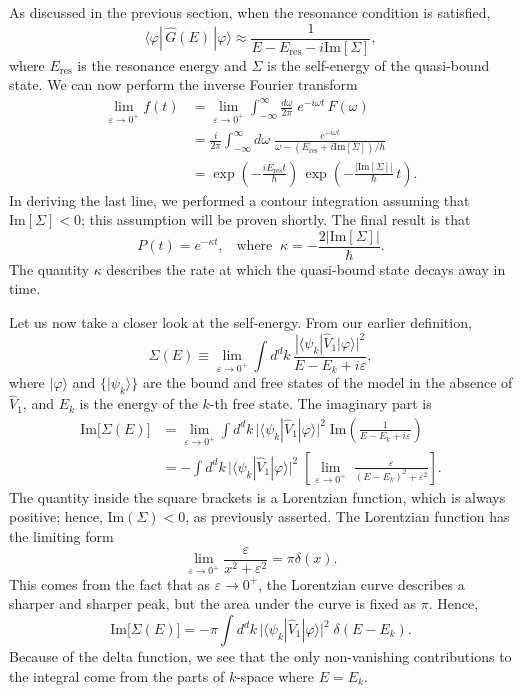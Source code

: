 \documentclass[pra,12pt]{revtex4}
\begin{document}
As discussed in the previous section, when the resonance condition is
satisfied,
$$ \langle\varphi|\,\hat{G}(E)\,|\varphi\rangle \approx \frac{1}{\displaystyle E - E_{\mathrm{res}} - i \mathrm{Im}[\Sigma]},$$
where $E_{\mathrm{res}}$ is the resonance energy and $\Sigma$ is the
self-energy of the quasi-bound state.  We can now perform the
inverse Fourier transform
$$\begin{aligned} \lim_{\varepsilon\rightarrow 0^+} f(t) &= \lim_{\varepsilon\rightarrow 0^+} \int_{-\infty}^{\infty} \frac{d\omega}{2\pi} \; e^{-i\omega t} \, F(\omega) \\ &= \frac{i}{2\pi} \int_{-\infty}^{\infty} d\omega\; \frac{e^{-i\omega t}}{\omega - (E_{\mathrm{res}}+i \mathrm{Im}[\Sigma])/\hbar}\\ &= \exp\left(-\frac{iE_{\mathrm{res}}t}{\hbar}\right)\, \exp\left(-\frac{|\mathrm{Im}[\Sigma]|}{\hbar}\,t\right). \end{aligned}$$
In deriving the last line, we performed a contour integration assuming
that $\mathrm{Im}[\Sigma] < 0$; this assumption will be proven
shortly.  The final result is that
$$P(t) = e^{-\kappa t}, \;\;\;\mathrm{where}\;\;\kappa = -\frac{2|\mathrm{Im}[\Sigma]|}{\hbar}.$$
The quantity $\kappa$ describes the rate at which the quasi-bound
state decays away in time.

Let us now take a closer look at the self-energy.  From our earlier
definition,
$$\Sigma(E) \equiv \lim_{\varepsilon\rightarrow0^+} \int d^dk\, \frac{\displaystyle| \langle\psi_k| \hat{V}_1|\varphi\rangle|^2}{\displaystyle E-E_k+i\varepsilon},$$
where $|\varphi\rangle$ and $\{|\psi_k\rangle\}$ are the bound and
free states of the model in the absence of $\hat{V}_1$, and $E_k$ is
the energy of the $k$-th free state.  The imaginary part is
$$\begin{aligned}\mathrm{Im}\big[\Sigma(E)\big] &= \lim_{\varepsilon\rightarrow0^+} \int d^dk\, \Big| \langle\psi_k| \hat{V}_1|\varphi\rangle\Big|^2 \; \mathrm{Im}\left( \frac{1}{\displaystyle E-E_k+i\varepsilon}\right) \\ &= - \int d^dk\, \Big| \langle\psi_k| \hat{V}_1|\varphi\rangle\Big|^2 \; \left[ \lim_{\varepsilon\rightarrow0^+} \; \frac{\varepsilon}{\displaystyle (E-E_k)^2 + \varepsilon^2}\right].\end{aligned}$$
The quantity inside the square brackets is a Lorentzian function,
which is always positive; hence, $\mathrm{Im}(\Sigma) < 0$, as
previously asserted.  The Lorentzian function has the limiting form
$$\lim_{\varepsilon\rightarrow 0^+} \frac{\varepsilon}{x^2+\varepsilon^2} = \pi\delta(x).$$
This comes from the fact that as $\varepsilon\rightarrow0^+$, the
Lorentzian curve describes a sharper and sharper peak, but the area
under the curve is fixed as $\pi$.  Hence,
$$\mathrm{Im}\big[\Sigma(E)\big] = - \pi \int d^dk\, \Big| \langle\psi_k| \hat{V}_1|\varphi\rangle\Big|^2 \; \delta(E-E_k).$$
Because of the delta function, we see that the only non-vanishing
contributions to the integral come from the parts of $k$-space where
$E = E_k$.
\end{document}
